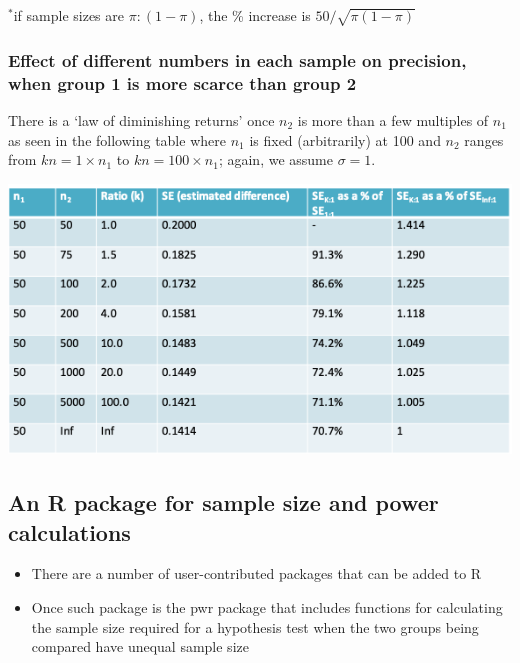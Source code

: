 \documentclass[
]{book}
\providecommand{\tightlist}{%
  \setlength{\itemsep}{0pt}\setlength{\parskip}{0pt}}
\begin{document}
\(^*\)if sample sizes are \(\pi:(1-\pi)\), the \% increase is \(50/\sqrt{\pi(1-\pi)}\)

\hypertarget{effect-of-different-numbers-in-each-sample-on-precision-when-group-1-is-more-scarce-than-group-2}{%
\subsubsection{Effect of different numbers in each sample on precision, when group 1 is more scarce than group 2}\label{effect-of-different-numbers-in-each-sample-on-precision-when-group-1-is-more-scarce-than-group-2}}

There is a `law of diminishing returns' once \(n_2\) is more than a few multiples of \(n_1\) as seen in the following table where \(n_1\) is fixed (arbitrarily) at 100 and \(n_2\) ranges from \(kn=1 \times n_1\) to \(kn=100 \times n_1\); again, we assume \(\sigma=1\).

\includegraphics[width=1\linewidth]{./4_76}

\hypertarget{an-r-package-for-sample-size-and-power-calculations}{%
\subsection{An R package for sample size and power calculations}\label{an-r-package-for-sample-size-and-power-calculations}}

\begin{itemize}
\tightlist
\item
  There are a number of user-contributed packages that can be added to R
\item
  Once such package is the pwr package that includes functions for calculating the sample size required for a hypothesis test when the two groups being compared have unequal sample size
\end{itemize}
\end{document}
